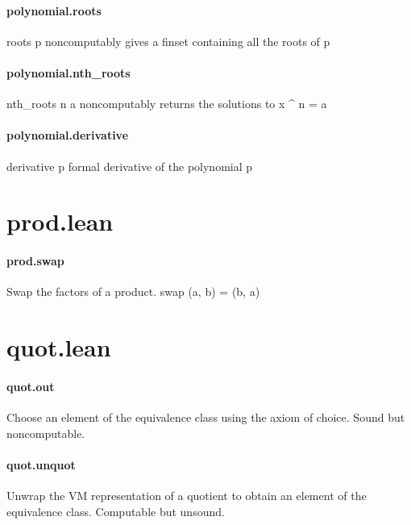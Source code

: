 \documentclass{article}
\begin{document}
\paragraph{polynomial.roots}
\par
\colorbox[RGB]{253,246,227}{{{{\color[RGB]{101, 123, 131} roots p }}}} noncomputably gives a finset containing all the roots of 
\colorbox[RGB]{253,246,227}{{{{\color[RGB]{101, 123, 131} p }}}}\paragraph{polynomial.nth\_roots}
\par
\colorbox[RGB]{253,246,227}{{{{\color[RGB]{101, 123, 131} nth\_roots n a }}}} noncomputably returns the solutions to 
\colorbox[RGB]{253,246,227}{{{{\color[RGB]{101, 123, 131} x \textasciicircum{} n  }}}{{{\color[RGB]{181, 137, 0} = }}}{{{\color[RGB]{101, 123, 131}  a }}}}\paragraph{polynomial.derivative}
\par
\colorbox[RGB]{253,246,227}{{{{\color[RGB]{101, 123, 131} derivative p }}}} formal derivative of the polynomial 
\colorbox[RGB]{253,246,227}{{{{\color[RGB]{101, 123, 131} p }}}}\section{prod.lean}\paragraph{prod.swap}
\par
Swap the factors of a product. 
\colorbox[RGB]{253,246,227}{{{{\color[RGB]{101, 123, 131} swap (a, b)  }}}{{{\color[RGB]{181, 137, 0} = }}}{{{\color[RGB]{101, 123, 131}  (b, a) }}}}\section{quot.lean}\paragraph{quot.out}
\par
Choose an element of the equivalence class using the axiom of choice.
Sound but noncomputable.
\paragraph{quot.unquot}
\par
Unwrap the VM representation of a quotient to obtain an element of the equivalence class.
Computable but unsound.
\end{document}
